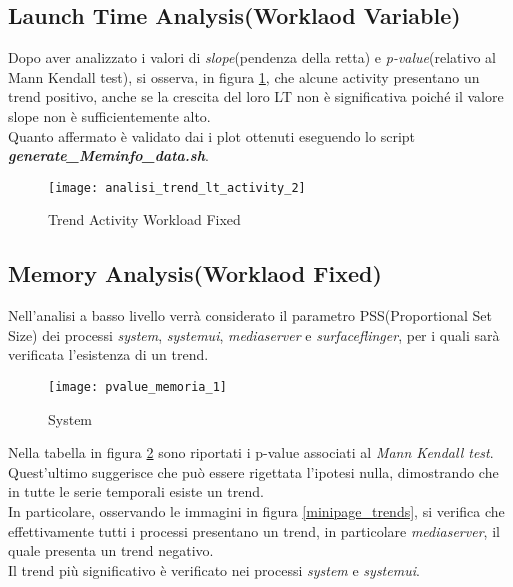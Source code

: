 \clearpage

\subsection{Launch Time Analysis(Worklaod Variable)}
Dopo aver analizzato i valori di \textit{slope}(pendenza della retta) e
\textit{p-value}(relativo al Mann Kendall test), si osserva, in figura \ref{analisi_trend_lt_activity_2},
che alcune activity presentano un trend positivo, anche se la crescita
del loro LT non è significativa poiché il valore slope non è sufficientemente
alto.\\
Quanto affermato è validato dai i plot ottenuti eseguendo lo script
\textit{\textbf{generate\_Meminfo\_data.sh}}.

\begin{figure}[!htbp]
  \centering
  \texttt{[image: analisi\_trend\_lt\_activity\_2]}
  \caption{Trend Activity Workload Fixed}
  \label{analisi_trend_lt_activity_2}
\end{figure}

\clearpage

\subsection{Memory Analysis(Worklaod Fixed)}

Nell'analisi a basso livello verrà considerato il parametro PSS(Proportional Set Size)
dei processi \textit{system}, \textit{systemui}, \textit{mediaserver} e
\textit{surfaceflinger}, per i quali sarà verificata l'esistenza di un trend.\\

\begin{figure}[!htbp]
  \centering
  \texttt{[image: pvalue\_memoria\_1]}
  \caption{System}
  \label{pvalue_memoria_1}
\end{figure}

Nella tabella in figura \ref{pvalue_memoria_1} sono riportati i p-value associati
al \textit{Mann Kendall test}.\\
Quest'ultimo suggerisce che può essere rigettata l'ipotesi nulla, dimostrando
che in tutte le serie temporali esiste un trend.\\
In particolare, osservando le immagini in figura \ref{minipage_trends}, si verifica che effettivamente
tutti i processi presentano un trend, in particolare \textit{mediaserver},
il quale presenta un trend negativo.\\
Il trend più significativo è verificato nei processi \textit{system} e \textit{systemui}.

